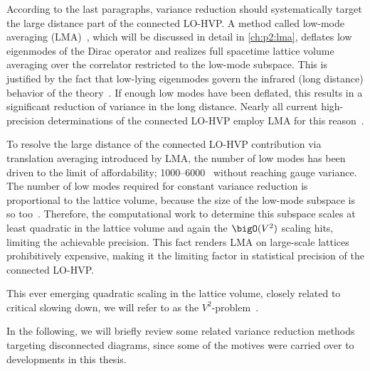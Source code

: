 According to the last paragraphs, variance reduction should systematically target the large distance part of the connected LO-HVP.
A method called low-mode averaging (LMA)~\cite{Neff_2001,DeGrand_2004,Giusti_2004}, which will be discussed in detail in \cref{ch:p2:lma}, deflates low eigenmodes of the Dirac operator and realizes full spacetime lattice volume averaging over the correlator restricted to the low-mode subspace.
This is justified by the fact that low-lying eigenmodes govern the infrared (long distance) behavior of the theory~\cite{DeGrand_2004}.
If enough low modes have been deflated, this results in a significant reduction of variance in the long distance.
Nearly all current high-precision determinations of the connected LO-HVP employ LMA for this reason~\cite{snowmass:2025,PhysRevLett.121.022003,bmw_2021,PhysRevD.101.074515,PhysRevD.107.034513,Aubin:2022hgm,ExtendedTwistedMass:2022jpw,PhysRevD.108.054507,bmw_2024,Spiegel:2024dec,PhysRevLett.134.201901,Djukanovic:2024cmq,milc_gm2,FermilabLatticeHPQCD:2024ppc}.

To resolve the large distance of the connected LO-HVP contribution via translation averaging introduced by LMA, the number of low modes has been driven to the limit of affordability; \numrange{1000}{6000}~\cite{Djukanovic:2024cmq,RBC_2024,bmw_2024,Aubin:2022hgm} without reaching gauge variance.
The number of low modes required for constant variance reduction is proportional to the lattice volume, because the size of the low-mode subspace is so too~\cite{banks1980}.
Therefore, the computational work to determine this subspace scales at least quadratic in the lattice volume and again the $\bigO(V^{2})$ scaling hits, limiting the achievable precision.
This fact renders LMA on large-scale lattices prohibitively expensive, making it the limiting factor in statistical precision of the connected LO-HVP.

This ever emerging quadratic scaling in the lattice volume, closely related to critical slowing down, we will refer to as the $V^{2}$-problem~\cite{Luescher2007}.

In the following, we will briefly review some related variance reduction methods targeting disconnected diagrams, since some of the motives were carried over to developments in this thesis.

